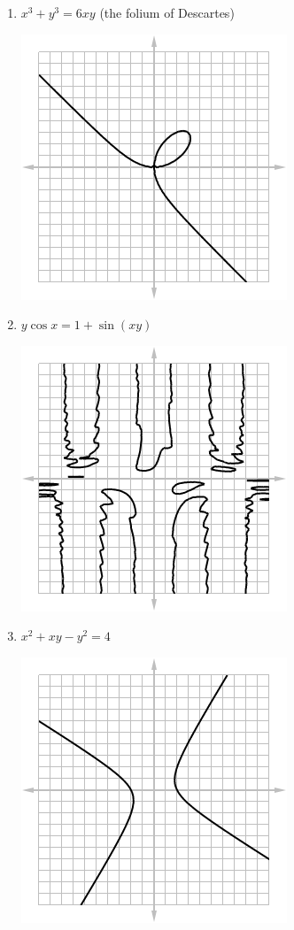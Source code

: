 \begin{enumerate}
\begin{multicols}{2}
\begin{enumerate}
      \item $ x^3 + y^3 = 6xy $ (the folium of Descartes)
            \begin{center}
              \includegraphics[width=0.6\linewidth]{folium}
            \end{center}
      \item $ y \cos x = 1 + \sin(xy) $
            \begin{center}
              \includegraphics[width=0.6\linewidth]{implicit6}
            \end{center}
      \vfill\null
      \columnbreak
      \item $ x^2 + xy - y^2 = 4 $
            \begin{center}
              \includegraphics[width=0.6\linewidth]{implicit4}

\end{center}
\end{enumerate}
\end{multicols}
\end{enumerate}
